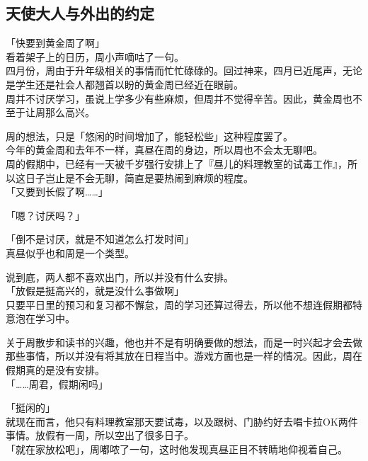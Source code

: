\subsection{天使大人与外出的约定}

「快要到黄金周了啊」\\

看着架子上的日历，周小声嘀咕了一句。\\

四月份，周由于升年级相关的事情而忙忙碌碌的。回过神来，四月已近尾声，无论是学生还是社会人都翘首以盼的黄金周已经近在眼前。\\

周并不讨厌学习，虽说上学多少有些麻烦，但周并不觉得辛苦。因此，黄金周也不至于让周那么高兴。

周的想法，只是「悠闲的时间增加了，能轻松些」这种程度罢了。\\

今年的黄金周和去年不一样，真昼在周的身边，所以周也不会太无聊吧。\\

周的假期中，已经有一天被千岁强行安排上了『昼儿的料理教室的试毒工作』，所以这日子岂止是不会无聊，简直是要热闹到麻烦的程度。\\

「又要到长假了啊……」

「嗯？讨厌吗？」

「倒不是讨厌，就是不知道怎么打发时间」\\

真昼似乎也和周是一个类型。

说到底，两人都不喜欢出门，所以并没有什么安排。\\

「放假是挺高兴的，就是没什么事做啊」\\

只要平日里的预习和复习都不懈怠，周的学习还算过得去，所以他不想连假期都特意泡在学习中。

关于周散步和读书的兴趣，他也并不是有明确要做的想法，而是一时兴起才会去做那些事情，所以并没有将其放在日程当中。游戏方面也是一样的情况。因此，周在假期真的是没有安排。\\

「……周君，假期闲吗」

「挺闲的」\\

就现在而言，他只有料理教室那天要试毒，以及跟树、门胁约好去唱卡拉OK两件事情。放假有一周，所以空出了很多日子。\\

「就在家放松吧」，周嘟哝了一句，这时他发现真昼正目不转睛地仰视着自己。\\

